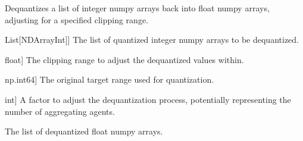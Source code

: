 \documentclass[letterpaper,10pt,english]{sphinxmanual}
\begin{document}

\begin{fulllineitems}
\label{\detokenize{utils_quantisation:utils_quantisation.dequantize}}
\pysigstartsignatures
{}
\pysigstopsignatures
\sphinxAtStartPar
Dequantizes a list of integer numpy arrays back into float numpy arrays, adjusting for a specified clipping range.
\begin{description}
\begin{description}
\sphinxlineitem{quantized\_parameters}{[}List{[}NDArrayInt{]}{]}
\sphinxAtStartPar
The list of quantized integer numpy arrays to be dequantized.

\sphinxlineitem{clipping\_range}{[}float{]}
\sphinxAtStartPar
The clipping range to adjust the dequantized values within.

\sphinxlineitem{target\_range}{[}np.int64{]}
\sphinxAtStartPar
The original target range used for quantization.

\sphinxlineitem{ag\_no}{[}int{]}
\sphinxAtStartPar
A factor to adjust the dequantization process, potentially representing the number of aggregating agents.

\end{description}

\begin{description}
\sphinxAtStartPar
The list of dequantized float numpy arrays.

\end{description}

\end{description}

\end{fulllineitems}
\end{document}
